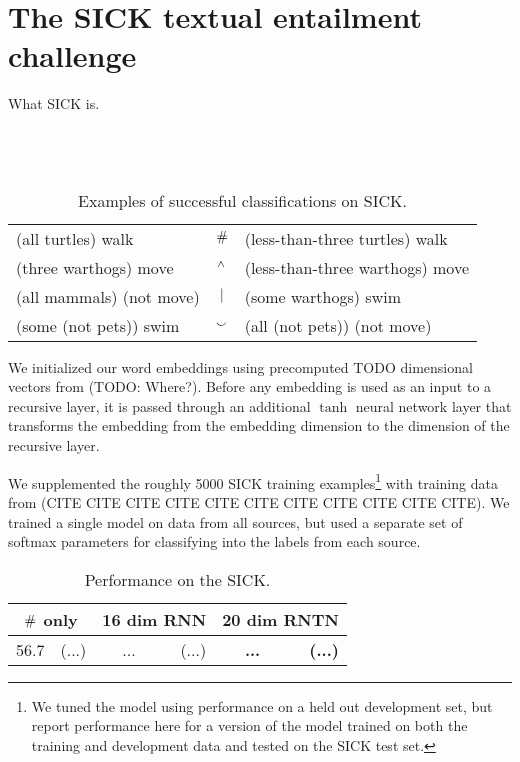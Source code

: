 \section{The SICK textual entailment challenge}

What SICK is. \cite{marelli2014sick}
\\ \\ \\ \\


\begin{table*}[htp]
  \centering
  \begin{tabular}{lcl}
    \toprule
    (all turtles) walk      &    $\mathbin{\#}$  & (less-than-three turtles) walk\\
    (three warthogs) move  &        $\mathbin{^{\wedge}}$ & (less-than-three warthogs) move\\
    (all mammals) (not move) &         $\mathbin{|}$ & (some warthogs) swim\\
    (some (not pets)) swim     &     $\mathbin{\smallsmile}$  & (all (not pets)) (not move)\\
    \bottomrule
  \end{tabular}
  \caption{\label{examplesofsickdata}Examples of successful classifications on SICK.}
\end{table*}

We initialized our word embeddings using precomputed TODO dimensional vectors from 
(TODO: Where?). Before any embedding is used as an input to a recursive layer, 
it is passed through an additional $\tanh$ neural network layer that transforms
the embedding from the embedding
dimension to the dimension of the recursive layer.

We supplemented the roughly 5000 SICK training examples\footnote{We tuned the model using performance on a held out development set, but report performance here for a version of the model trained on both the training and development data and tested on the SICK test set.} with training data from (CITE CITE CITE CITE CITE CITE CITE CITE CITE CITE CITE). We trained a single model on data from all sources, but used a separate set of softmax parameters for classifying into the labels from each source.

\begin{table}[tp]
  \centering
  \setlength{\tabcolsep}{10pt}
  \begin{tabular}{ r@{ \ }r r@{ \ }r r@{ \ }r }
    \toprule
    \multicolumn{2}{c}{$\mathbin{\#}$ only} & \multicolumn{2}{c}{16 dim RNN}  & \multicolumn{2}{c}{20 dim RNTN}\\
    \midrule
    56.7 &(...) &	...&(...)& \textbf{...} & \textbf{(...)}\\
    \bottomrule
  \end{tabular}
  \caption{Performance on the SICK.}
  \label{sresultstable}
\end{table} 

